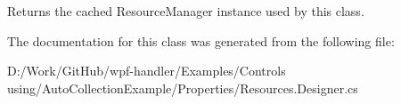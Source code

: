 Returns the cached Resource\+Manager instance used by this class. 



The documentation for this class was generated from the following file\+:\begin{DoxyCompactItemize}
\item 
D\+:/\+Work/\+Git\+Hub/wpf-\/handler/\+Examples/\+Controls using/\+Auto\+Collection\+Example/\+Properties/Resources.\+Designer.\+cs\end{DoxyCompactItemize}
